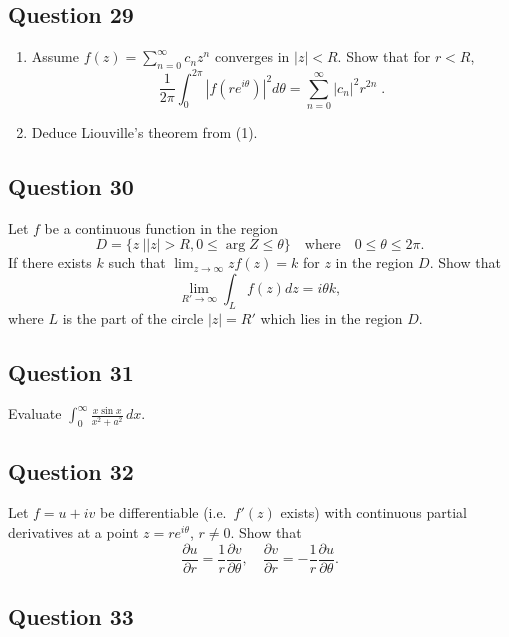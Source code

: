 \documentclass[12pt]{article}
\begin{document}
\hypertarget{question-29-2}{%
\subsection{Question 29}\label{question-29-2}}

\begin{enumerate}
\def\labelenumi{(\arabic{enumi})}
\item
  Assume \(\displaystyle f(z) = \sum_{n=0}^\infty c_n z^n\) converges in
  \(|z| < R\). Show that for \(r <R\),
  \[\frac{1}{2 \pi} \int_0^{2 \pi} |f(r e^{i \theta})|^2 d \theta =
  \sum_{n=0}^\infty |c_n|^2 r^{2n} \; .\]
\item
  Deduce Liouville's theorem from (1).
\end{enumerate}

\hypertarget{question-30-2}{%
\subsection{Question 30}\label{question-30-2}}

Let \(f\) be a continuous function in the region
\[D=\{z\ |  |z|>R, 0\leq \arg Z\leq \theta\}\quad\text{where}\quad
0\leq \theta \leq 2\pi.\] If there exists \(k\) such that
\(\displaystyle{\lim_{z\to\infty} zf(z)=k}\) for \(z\) in the region
\(D\). Show that \[\lim_{R'\to\infty} \int_{L} f(z) dz=i\theta k,\]
where \(L\) is the part of the circle \(|z|=R'\) which lies in the
region \(D\).

\hypertarget{question-31-2}{%
\subsection{Question 31}\label{question-31-2}}

Evaluate
\(\displaystyle{ \int_{0}^{\infty}\frac{x\sin x}{x^2+a^2} \,dx }\).

\hypertarget{question-32-2}{%
\subsection{Question 32}\label{question-32-2}}

Let \(f=u+iv\) be differentiable (i.e.~\(f'(z)\) exists) with continuous
partial derivatives at a point \(z=re^{i\theta}\), \(r\not= 0\). Show
that
\[\frac{\partial u}{\partial r}=\frac{1}{r}\frac{\partial v}{\partial \theta},\quad
\frac{\partial v}{\partial r}=-\frac{1}{r}\frac{\partial u}{\partial \theta}.\]

\hypertarget{question-33-2}{%
\subsection{Question 33}\label{question-33-2}}
\end{document}
